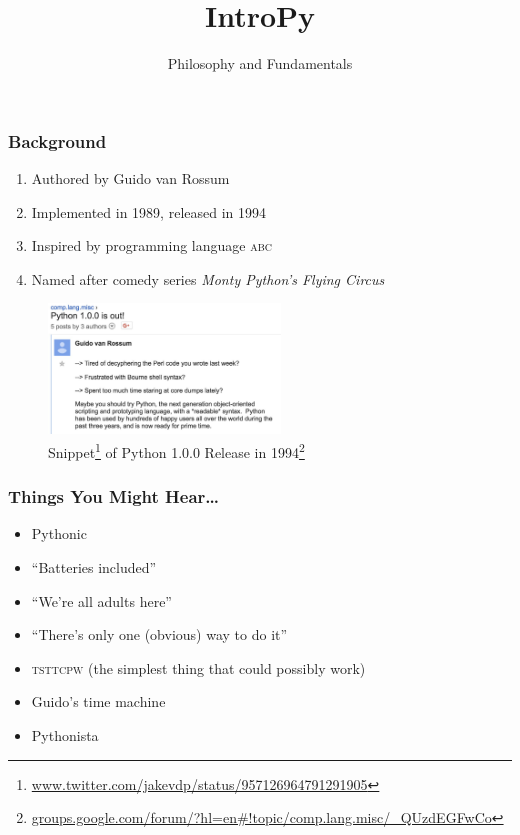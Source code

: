 \documentclass{beamer}
\title{IntroPy}
\subtitle{Philosophy and Fundamentals}
\begin{document}
\frame{\titlepage}


\begin{frame}
  \frametitle{Background}
  \begin{enumerate}
    \item Authored by Guido van Rossum
    \item Implemented in 1989, released in 1994
    \item Inspired by programming language \textsc{abc}
    \item Named after comedy series \textit{Monty Python's Flying Circus}
  \end{enumerate}
  \begin{figure}
    \begin{center}
    \includegraphics[width=175pt,keepaspectratio]{release.jpg}
    \caption
    {
      Snippet\footnote{\url{www.twitter.com/jakevdp/status/957126964791291905}}
      of Python 1.0.0 Release in 
      1994\footnote
      {
       \url{groups.google.com/forum/?hl=en\#!topic/comp.lang.misc/_QUzdEGFwCo}
      }
    }
    \end{center}
  \end{figure}
\end{frame}


\begin{frame}
  \frametitle{Things You Might Hear\ldots}
  \begin{itemize}
    \item Pythonic
    \item ``Batteries included''
    \item ``We're all adults here''
    \item ``There's only one (obvious) way to do it''
    \item \textsc{tsttcpw} (the simplest thing that could possibly work)
    \item Guido's time machine
    \item Pythonista
  \end{itemize}
\end{frame}
\end{document}
